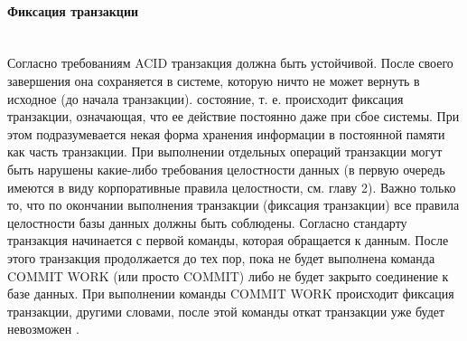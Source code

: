 \paragraph{Фиксация транзакции} ~\\
Согласно требованиям ACID транзакция должна быть устойчивой. После своего завершения она сохраняется в системе, которую ничто не может вернуть в исходное (до начала транзакции). состояние, т. е. происходит фиксация транзакции, означающая, что ее действие постоянно даже при сбое системы. При этом подразумевается некая
форма хранения информации в постоянной памяти как часть транзакции.
При выполнении отдельных операций транзакции могут быть нарушены какие-либо требования целостности данных (в первую очередь имеются в виду
корпоративные правила целостности, см. главу 2). Важно только то, что
по окончании выполнения транзакции (фиксация транзакции) все правила
целостности базы данных должны быть соблюдены.
Согласно стандарту транзакция начинается с первой команды, которая обращается к данным. После этого транзакция продолжается до тех пор, пока не
будет выполнена команда COMMIT WORK (или просто COMMIT) либо не будет закрыто соединение к базе данных. При выполнении команды COMMIT WORK происходит фиксация транзакции, другими словами, после этой команды откат транзакции уже будет невозможен \autocite{Pirogov2009}.

